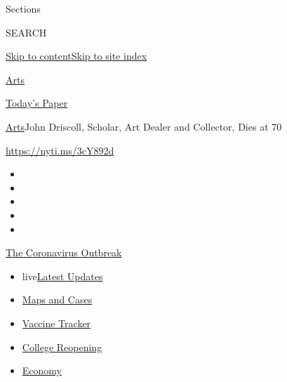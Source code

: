 Sections

SEARCH

\protect\hyperlink{site-content}{Skip to
content}\protect\hyperlink{site-index}{Skip to site index}

\href{https://www.nytimes.com/section/arts}{Arts}

\href{https://myaccount.nytimes.com/auth/login?response_type=cookie\&client_id=vi}{}

\href{https://www.nytimes.com/section/todayspaper}{Today's Paper}

\href{/section/arts}{Arts}\textbar{}John Driscoll, Scholar, Art Dealer
and Collector, Dies at 70

\url{https://nyti.ms/3cY892d}

\begin{itemize}
\item
\item
\item
\item
\item
\end{itemize}

\href{https://www.nytimes.com/news-event/coronavirus?action=click\&pgtype=Article\&state=default\&region=TOP_BANNER\&context=storylines_menu}{The
Coronavirus Outbreak}

\begin{itemize}
\tightlist
\item
  live\href{https://www.nytimes.com/2020/08/03/world/coronavirus-covid-19.html?action=click\&pgtype=Article\&state=default\&region=TOP_BANNER\&context=storylines_menu}{Latest
  Updates}
\item
  \href{https://www.nytimes.com/interactive/2020/us/coronavirus-us-cases.html?action=click\&pgtype=Article\&state=default\&region=TOP_BANNER\&context=storylines_menu}{Maps
  and Cases}
\item
  \href{https://www.nytimes.com/interactive/2020/science/coronavirus-vaccine-tracker.html?action=click\&pgtype=Article\&state=default\&region=TOP_BANNER\&context=storylines_menu}{Vaccine
  Tracker}
\item
  \href{https://www.nytimes.com/2020/08/02/us/covid-college-reopening.html?action=click\&pgtype=Article\&state=default\&region=TOP_BANNER\&context=storylines_menu}{College
  Reopening}
\item
  \href{https://www.nytimes.com/live/2020/08/03/business/stock-market-today-coronavirus?action=click\&pgtype=Article\&state=default\&region=TOP_BANNER\&context=storylines_menu}{Economy}
\end{itemize}

